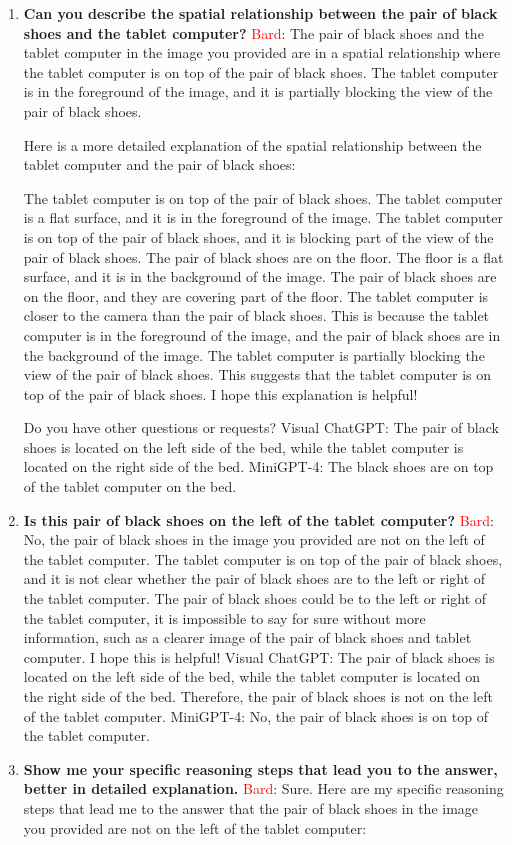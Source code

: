 \begin{enumerate}
    \item \textbf{Can you describe the spatial relationship between the pair of black shoes and the tablet computer?}
    \subitem \textcolor{Red}{Bard}: The pair of black shoes and the tablet computer in the image you provided are in a spatial relationship where the tablet computer is on top of the pair of black shoes. The tablet computer is in the foreground of the image, and it is partially blocking the view of the pair of black shoes.

    Here is a more detailed explanation of the spatial relationship between the tablet computer and the pair of black shoes:
    
    The tablet computer is on top of the pair of black shoes. The tablet computer is a flat surface, and it is in the foreground of the image. The tablet computer is on top of the pair of black shoes, and it is blocking part of the view of the pair of black shoes.
    The pair of black shoes are on the floor. The floor is a flat surface, and it is in the background of the image. The pair of black shoes are on the floor, and they are covering part of the floor.
    The tablet computer is closer to the camera than the pair of black shoes. This is because the tablet computer is in the foreground of the image, and the pair of black shoes are in the background of the image.
    The tablet computer is partially blocking the view of the pair of black shoes. This suggests that the tablet computer is on top of the pair of black shoes.
    I hope this explanation is helpful!
    
    Do you have other questions or requests?
    \subitem Visual ChatGPT: The pair of black shoes is located on the left side of the bed, while the tablet computer is located on the right side of the bed.
    \subitem MiniGPT-4: The black shoes are on top of the tablet computer on the bed.
    \item \textbf{Is this pair of black shoes on the left of the tablet computer?}
    \subitem \textcolor{Red}{Bard}: 
    No, the pair of black shoes in the image you provided are not on the left of the tablet computer. The tablet computer is on top of the pair of black shoes, and it is not clear whether the pair of black shoes are to the left or right of the tablet computer.
    The pair of black shoes could be to the left or right of the tablet computer, it is impossible to say for sure without more information, such as a clearer image of the pair of black shoes and tablet computer.
    I hope this is helpful! 
    \subitem Visual ChatGPT: The pair of black shoes is located on the left side of the bed, while the tablet computer is located on the right side of the bed. Therefore, the pair of black shoes is not on the left of the tablet computer.
    \subitem MiniGPT-4: No, the pair of black shoes is on top of the tablet computer.
    \item \textbf{Show me your specific reasoning steps that lead you to the answer, better in detailed explanation.}
    \subitem \textcolor{Red}{Bard}: Sure. Here are my specific reasoning steps that lead me to the answer that the pair of black shoes in the image you provided are not on the left of the tablet computer:


\end{enumerate}
